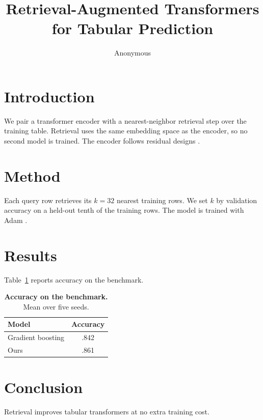 \documentclass[10pt]{article}
\title{Retrieval-Augmented Transformers for Tabular Prediction}
\author{Anonymous}
\date{}
\newcommand{\rev}[1]{{\color{revblue}#1}}
\newcommand{\new}[1]{{\color{neworange}#1}}
\begin{document}
\maketitle

\section{Introduction}
We pair a transformer encoder with a nearest-neighbor retrieval step over the
training table. \rev{Retrieval uses the same embedding space as the encoder, so
no second model is trained.} The encoder follows residual designs
\citep{he2016resnet}.

\section{Method}
Each query row retrieves its $k=32$ nearest training rows. \new{We set $k$ by
validation accuracy on a held-out tenth of the training rows.} The model is
trained with Adam \citep{kingma2015adam}.

\section{Results}
Table~\ref{tab:main} reports accuracy on the benchmark.
\begin{table}[h]
  \caption{\textbf{Accuracy on the benchmark.} Mean over five seeds.}\label{tab:main}
  \centering
  \begin{tabular}{@{}lc@{}}\toprule Model & Accuracy \\\midrule Gradient boosting & .842 \\ Ours & .861 \\\bottomrule\end{tabular}
\end{table}

\section{Conclusion}
Retrieval improves tabular transformers at no extra training cost.



\end{document}

